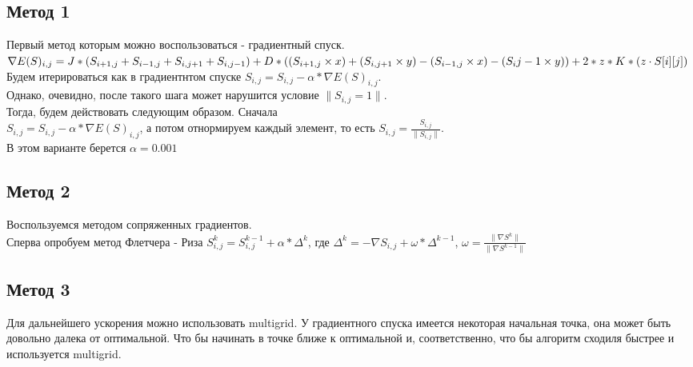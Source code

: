 \documentclass[ 12pt,x11names]{article}
\begin{document}
    \subsection{Метод 1}
    Первый метод которым можно воспользоваться  - градиентный спуск.
    $\nabla E(S)_{i, j} = J * (S_{i + 1,j} + S_{i - 1,j} + S_{i, j + 1} + S_{i, j - 1})
        + \\ D * ( (S_{i + 1,j} \times x) + (S_{i, j + 1} \times y) -  (S_{i - 1, j} \times x) - (S_{i}{j - 1} \times y) )
        + 2 * z * K * (z \cdot S[i][j])$\\
    Будем  итерироваться как в градиентнтом спуске $S_{i, j} = S_{i, j} - \alpha * \nabla E(S)_{i, j}$.\\
    Однако, очевидно, после такого шага может  нарушится условие $\|S_{i, j} = 1\|$.\\
    Тогда, будем действовать следующим образом. Сначала \\$S_{i, j} = S_{i, j} - \alpha * \nabla E(S)_{i, j}$, а потом отнормируем каждый элемент, то есть $S_{i, j} = \frac{S_{i, j}}{\|S_{i, j}\|}$.\\
    В этом варианте берется $\alpha = 0.001$\\
    \subsection{Метод 2}
    Воспользуемся методом сопряженных градиентов.\\
    Сперва опробуем метод Флетчера - Риза
    $S^k_{i, j} = S^{k-1}_{i, j} + \alpha * \Delta^k $, где $\Delta^k = -\nabla S_{i, j} + \omega * \Delta ^  {k-1} $,
    $\omega  = \frac{\| \nabla S^k \|}{\| \nabla S^{k-1} \|}$


    \subsection{Метод 3}
    Для дальнейшего ускорения можно использовать multigrid.
    У градиентного спуска имеется некоторая начальная точка, она может быть довольно далека от оптимальной.
    Что бы начинать в точке ближе к оптимальной и, соответственно, что бы алгоритм сходиля быстрее и  используется multigrid.\\

    
\end{document}
